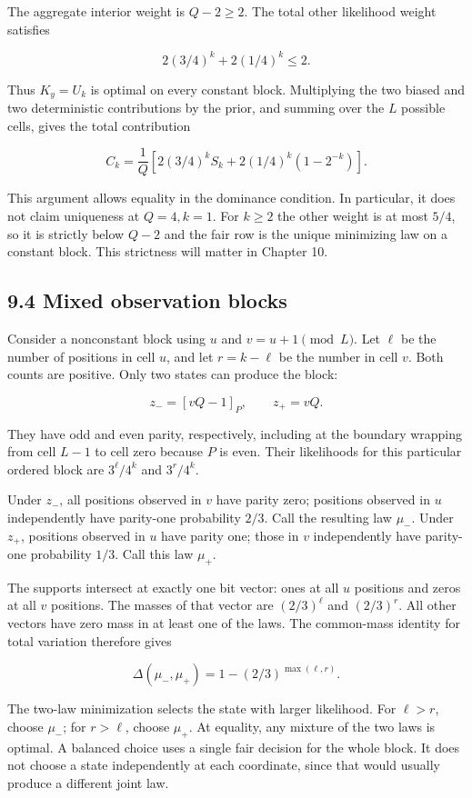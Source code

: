 \documentclass[
]{article}
\begin{document}
The aggregate interior weight is \(Q-2\ge2\). The total other likelihood
weight satisfies

\[
2(3/4)^k+2(1/4)^k\le2.
\]

Thus \(K_y=U_k\) is optimal on every constant block. Multiplying the two
biased and two deterministic contributions by the prior, and summing
over the \(L\) possible cells, gives the total contribution

\[
C_k=\frac1Q\left[2(3/4)^k S_k
+2(1/4)^k(1-2^{-k})\right].
\]

This argument allows equality in the dominance condition. In particular,
it does not claim uniqueness at \(Q=4,k=1\). For \(k\ge2\) the other
weight is at most \(5/4\), so it is strictly below \(Q-2\) and the fair
row is the unique minimizing law on a constant block. This strictness
will matter in Chapter 10.

\subsection{9.4 Mixed observation
blocks}\label{mixed-observation-blocks}

Consider a nonconstant block using \(u\) and \(v=u+1\pmod L\). Let
\(\ell\) be the number of positions in cell \(u\), and let \(r=k-\ell\)
be the number in cell \(v\). Both counts are positive. Only two states
can produce the block:

\[
z_-=[vQ-1]_P,\qquad z_+=vQ.
\]

They have odd and even parity, respectively, including at the boundary
wrapping from cell \(L-1\) to cell zero because \(P\) is even. Their
likelihoods for this particular ordered block are \(3^\ell/4^k\) and
\(3^r/4^k\).

Under \(z_-\), all positions observed in \(v\) have parity zero;
positions observed in \(u\) independently have parity-one probability
\(2/3\). Call the resulting law \(\mu_-\). Under \(z_+\), positions
observed in \(u\) have parity one; those in \(v\) independently have
parity-one probability \(1/3\). Call this law \(\mu_+\).

The supports intersect at exactly one bit vector: ones at all \(u\)
positions and zeros at all \(v\) positions. The masses of that vector
are \((2/3)^\ell\) and \((2/3)^r\). All other vectors have zero mass in
at least one of the laws. The common-mass identity for total variation
therefore gives

\[
\Delta(\mu_-,\mu_+)
=1-(2/3)^{\max(\ell,r)}.
\]

The two-law minimization selects the state with larger likelihood. For
\(\ell>r\), choose \(\mu_-\); for \(r>\ell\), choose \(\mu_+\). At
equality, any mixture of the two laws is optimal. A balanced choice uses
a single fair decision for the whole block. It does not choose a state
independently at each coordinate, since that would usually produce a
different joint law.
\end{document}
